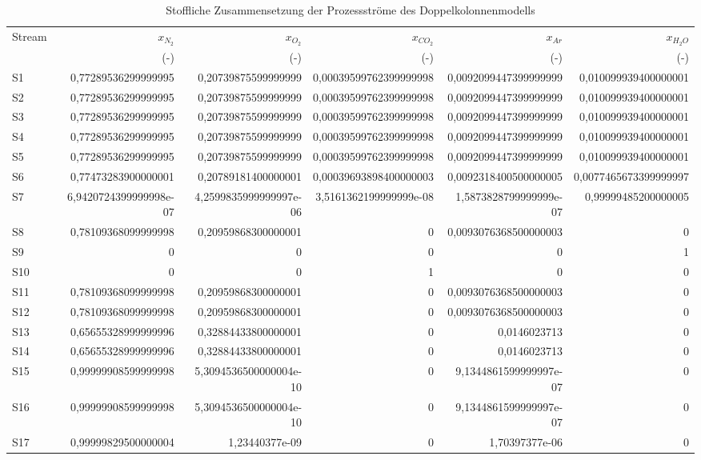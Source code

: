 \begin{longtable}{lrrrrr}
\caption{Stoffliche Zusammensetzung der Prozessströme des Doppelkolonnenmodells} \\
\hline
Stream & $x_{N_2}$ & $x_{O_2}$ & $x_{CO_2}$ & $x_{Ar}$ & $x_{H_2O}$ \\
 & (-) & (-) & (-) & (-) & (-) \\
\hline
S1 & 0,77289536299999995 & 0,20739875599999999 & 0,00039599762399999998 & 0,0092099447399999999 & 0,010099939400000001 \\
S2 & 0,77289536299999995 & 0,20739875599999999 & 0,00039599762399999998 & 0,0092099447399999999 & 0,010099939400000001 \\
S3 & 0,77289536299999995 & 0,20739875599999999 & 0,00039599762399999998 & 0,0092099447399999999 & 0,010099939400000001 \\
S4 & 0,77289536299999995 & 0,20739875599999999 & 0,00039599762399999998 & 0,0092099447399999999 & 0,010099939400000001 \\
S5 & 0,77289536299999995 & 0,20739875599999999 & 0,00039599762399999998 & 0,0092099447399999999 & 0,010099939400000001 \\
S6 & 0,77473283900000001 & 0,20789181400000001 & 0,00039693898400000003 & 0,0092318400500000005 & 0,0077465673399999997 \\
S7 & 6,9420724399999998e-07 & 4,2599835999999997e-06 & 3,5161362199999999e-08 & 1,5873828799999999e-07 & 0,99999485200000005 \\
S8 & 0,78109368099999998 & 0,20959868300000001 & 0 & 0,0093076368500000003 & 0 \\
S9 & 0 & 0 & 0 & 0 & 1 \\
S10 & 0 & 0 & 1 & 0 & 0 \\
S11 & 0,78109368099999998 & 0,20959868300000001 & 0 & 0,0093076368500000003 & 0 \\
S12 & 0,78109368099999998 & 0,20959868300000001 & 0 & 0,0093076368500000003 & 0 \\
S13 & 0,65655328999999996 & 0,32884433800000001 & 0 & 0,0146023713 & 0 \\
S14 & 0,65655328999999996 & 0,32884433800000001 & 0 & 0,0146023713 & 0 \\
S15 & 0,99999908599999998 & 5,3094536500000004e-10 & 0 & 9,1344861599999997e-07 & 0 \\
S16 & 0,99999908599999998 & 5,3094536500000004e-10 & 0 & 9,1344861599999997e-07 & 0 \\
S17 & 0,99999829500000004 & 1,23440377e-09 & 0 & 1,70397377e-06 & 0 \\

\end{longtable}

